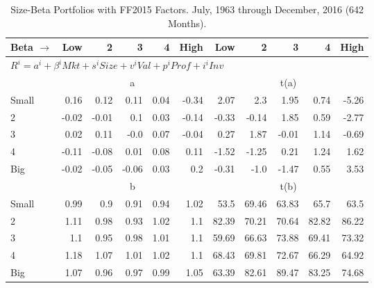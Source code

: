 
\begin{table}[!ht]
\centering
\caption{Size-Beta Portfolios with FF2015 Factors. \footnotesize{July, 1963 through December, 2016 (642 Months).}}
\begin{tabular}{lrrrrrrrrrr}
  \toprule
    Beta $\rightarrow$ & Low & 2 & 3 & 4 & High & Low & 2 & 3 & 4 & High \\ 
  \midrule
  \multicolumn{11}{l}{$R^i=a^i+\beta^iMkt+s^iSize+v^iVal+p^iProf+i^iInv$} \\

  
    
      & \multicolumn{5}{c}{a} & \multicolumn{5}{c}{t(a)}
    
    \\
      \cmidrule(r){2-6} \cmidrule(r){7-11}

    Small   & 0.16  & 0.12  & 0.11  & 0.04  & -0.34  & 2.07  & 2.3  & 1.95  & 0.74  & -5.26  \\
         2  & -0.02  & -0.01  & 0.1  & 0.03  & -0.14  & -0.33  & -0.14  & 1.85  & 0.59  & -2.77  \\
         3  & 0.02  & 0.11  & -0.0  & 0.07  & -0.04  & 0.27  & 1.87  & -0.01  & 1.14  & -0.69  \\
         4  & -0.11  & -0.08  & 0.01  & 0.08  & 0.11  & -1.52  & -1.25  & 0.21  & 1.24  & 1.62  \\
    Big     & -0.02  & -0.05  & -0.06  & 0.03  & 0.2  & -0.31  & -1.0  & -1.47  & 0.55  & 3.53  \\

  
    
      & \multicolumn{5}{c}{b} & \multicolumn{5}{c}{t(b)}
    
    \\
      \cmidrule(r){2-6} \cmidrule(r){7-11}

    Small   & 0.99  & 0.9  & 0.91  & 0.94  & 1.02  & 53.5  & 69.46  & 63.83  & 65.7  & 63.5  \\
         2  & 1.11  & 0.98  & 0.93  & 1.02  & 1.1  & 82.39  & 70.21  & 70.64  & 82.82  & 86.22  \\
         3  & 1.1  & 0.95  & 0.98  & 1.01  & 1.1  & 59.69  & 66.63  & 73.88  & 69.41  & 73.32  \\
         4  & 1.18  & 1.07  & 1.01  & 1.02  & 1.1  & 68.43  & 69.81  & 72.67  & 66.29  & 64.92  \\
    Big     & 1.07  & 0.96  & 0.97  & 0.99  & 1.05  & 63.39  & 82.61  & 89.47  & 83.25  & 74.68  \\

  
    

\end{tabular}
\end{table}
